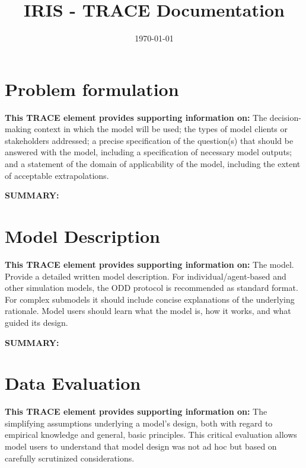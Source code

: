 \documentclass[a4paper, 11pt]{scrartcl}
\title{IRIS - TRACE Documentation}
\author{}
\date{\today}
\begin{document}
\maketitle
\tableofcontents


\section{Problem formulation}
\textbf{This TRACE element provides supporting information on:} The decision-making context in which the model will
be used; the types of model clients or stakeholders addressed; a precise specification of the question(s) that should be
answered with the model, including a specification of necessary model outputs; and a statement of the domain of
applicability of the model, including the extent of acceptable extrapolations.

\textbf{SUMMARY:}
\begin{addmargin}[3em]{2em}
\textbf{

}
\end{addmargin}



\clearpage
\section{Model Description}
\textbf{This TRACE element provides supporting information on:} The model. Provide a detailed written model
description. For individual/agent-based and other simulation models, the ODD protocol is recommended as standard format. For complex
submodels it should include concise explanations of the underlying rationale. Model users should learn what the model
is, how it works, and what guided its design.

\textbf{SUMMARY:}
\begin{addmargin}[3em]{2em}
	\textbf{

	}
\end{addmargin}



\clearpage
\section{Data Evaluation}
\textbf{This TRACE element provides supporting information on:} The simplifying assumptions underlying a model's
design, both with regard to empirical knowledge and general, basic principles. This critical evaluation allows model users to
understand that model design was not ad hoc but based on carefully scrutinized considerations.
\end{document}
